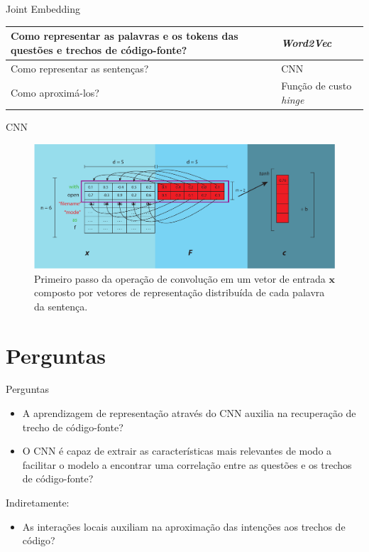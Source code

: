 \documentclass[10pt]{beamer}
\begin{document}
\begin{frame}{Joint Embedding}
   \begin{center}
       \begin{tabular}{|p{4cm}|p{4cm}|}
            \hline
            Como representar as palavras e os tokens das questões e trechos de código-fonte? & \textit{Word2Vec} \\ 
            \hline
            Como representar as sentenças? &  CNN \\
            \hline
            Como aproximá-los? &  Função de custo \textit{hinge} \\
            \hline
       \end{tabular}
   \end{center}
\end{frame}


\begin{frame}{CNN}
	\begin{figure}[h]
        \centering
        \includegraphics[width=1\linewidth]{figuras/first-step-convolution.pdf}
        \caption{Primeiro passo da operação de convolução em um vetor de entrada $\bm{x}$ composto por vetores de representação distribuída de cada palavra da sentença. }
        \label{fig:test1}
    \end{figure}
\end{frame}

\section{Perguntas}


\begin{frame}{Perguntas}
	\begin{itemize}
	    \item A aprendizagem de representação através do CNN auxilia na recuperação de trecho de código-fonte?
	    \item O CNN é capaz de extrair as características mais relevantes de modo a facilitar o modelo a encontrar uma correlação entre as questões e os trechos de código-fonte?
	\end{itemize}
	Indiretamente:
	\begin{itemize}
	    \item As interações locais auxiliam na aproximação das intenções aos trechos de código?
	\end{itemize}
\end{frame}
\end{document}
